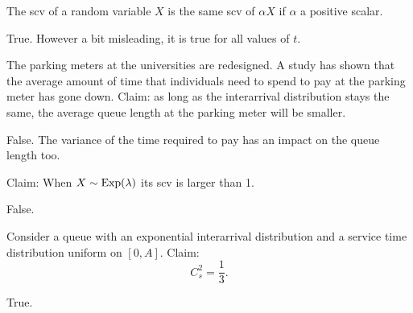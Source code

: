 \documentclass[stochastic-or.tex]{subfiles}
\begin{document}
\begin{truefalse}
The scv of a random variable $X$ is the same scv of $\alpha X$ if $\alpha$ a positive scalar.
\begin{solution}
        True. However a bit misleading, it is true for all values of $t$.
\end{solution}
\end{truefalse}

\begin{truefalse}
The parking meters at the universities are redesigned.
A study has shown that the average amount of time that individuals need to spend to pay at the parking  meter has gone down.
Claim: as long as the interarrival distribution stays the same, the average queue length at the parking meter will be smaller.
\begin{solution}
        False.  The variance of the time required to pay has an impact on the queue length too.
\end{solution}
\end{truefalse}

\begin{truefalse}
Claim: When $X\sim\mathrm{Exp}(\lambda)$ its scv is larger than 1.
\begin{solution} False.
\end{solution}
\end{truefalse}


\begin{truefalse}
    Consider a queue with an exponential interarrival distribution and a service time distribution uniform on $[0,A]$. Claim:
\begin{equation*}
        C_s^2 = \frac 13.
\end{equation*}

\begin{solution}
        True.
\end{solution}
\end{truefalse}
\end{document}

